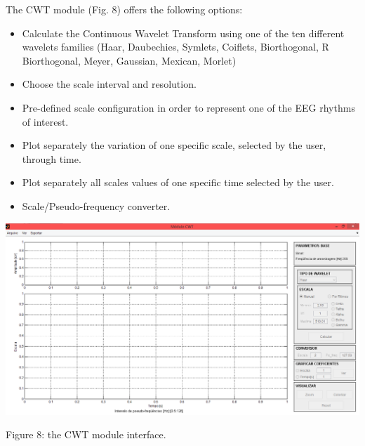 \documentclass[12pt, a4paper]{article}
\begin{document}
The CWT module (Fig. 8) offers the following options:
\begin{itemize}
\item Calculate the Continuous Wavelet Transform using one of the ten different wavelets families (Haar, Daubechies, Symlets, Coiflets, Biorthogonal, R Biorthogonal, Meyer, Gaussian, Mexican, Morlet)
\item Choose the scale interval and resolution.
\item Pre-defined scale configuration in order to represent one of the EEG rhythms of interest.
\item Plot separately the variation of one specific scale, selected by the user, through time.
\item Plot separately all scales values of one specific time selected by the user.
\item Scale/Pseudo-frequency converter.
\end{itemize}
\begin{center}
\includegraphics[width=15cm]{cwt.png}

Figure 8: the CWT module interface.
\end{center}
\end{document}
